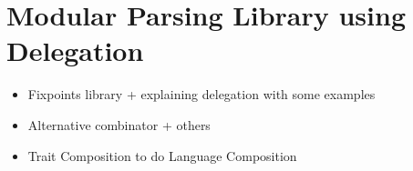 \section{Modular Parsing Library using Delegation}\label{sec:library}

\begin{itemize}
\item Fixpoints library + explaining delegation with some examples
\item Alternative combinator + others
\item Trait Composition to do Language Composition
\end{itemize}
